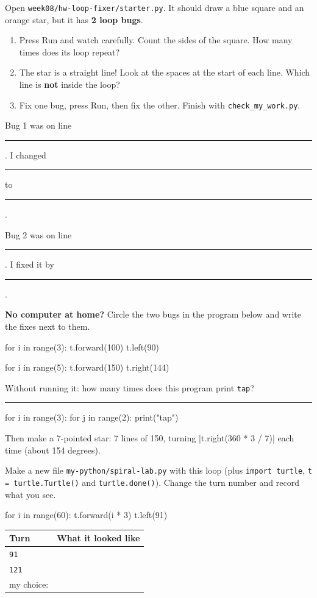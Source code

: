 \namedateline

\begin{core}
Open \texttt{week08/hw-loop-fixer/starter.py}. It should draw a blue square and an orange star, but it has \textbf{2 loop bugs}.
\begin{enumerate}[leftmargin=1.4em,itemsep=1pt]
  \item Press Run and watch carefully. Count the sides of the square. How many times does its loop repeat?
  \item The star is a straight line! Look at the spaces at the start of each line. Which line is \textbf{not} inside the loop?
  \item Fix one bug, press Run, then fix the other. Finish with \texttt{check\_my\_work.py}.
\end{enumerate}
Bug 1 was on line \rule{1cm}{0.4pt}. I changed \rule{3.5cm}{0.4pt} to \rule{3.5cm}{0.4pt}.\par\smallskip
Bug 2 was on line \rule{1cm}{0.4pt}. I fixed it by \rule{7cm}{0.4pt}.
\par\textbf{No computer at home?} Circle the two bugs in the program below and write the fixes next to them.
\begin{pycode}
for i in range(3):
    t.forward(100)
    t.left(90)

for i in range(5):
    t.forward(150)
t.right(144)
\end{pycode}
\end{core}

\begin{challenge}
Without running it: how many times does this program print \texttt{tap}? \rule{1.5cm}{0.4pt}
\begin{pycode}
for i in range(3):
    for j in range(2):
        print("tap")
\end{pycode}
Then make a 7-pointed star: 7 lines of 150, turning \py|t.right(360 * 3 / 7)| each time (about 154 degrees).
\end{challenge}

\begin{creative}
Make a new file \texttt{my-python/spiral-lab.py} with this loop (plus \texttt{import turtle}, \texttt{t = turtle.Turtle()} and \texttt{turtle.done()}). Change the turn number and record what you see.
\begin{pycode}
for i in range(60):
    t.forward(i * 3)
    t.left(91)
\end{pycode}
\begin{center}
\renewcommand{\arraystretch}{1.6}
\begin{tabular}{@{}p{2.5cm}p{10cm}@{}}
\toprule
Turn & What it looked like\\
\midrule
\texttt{91} & \\ \midrule
\texttt{121} & \\ \midrule
my choice: & \\
\bottomrule
\end{tabular}
\end{center}
\end{creative}

